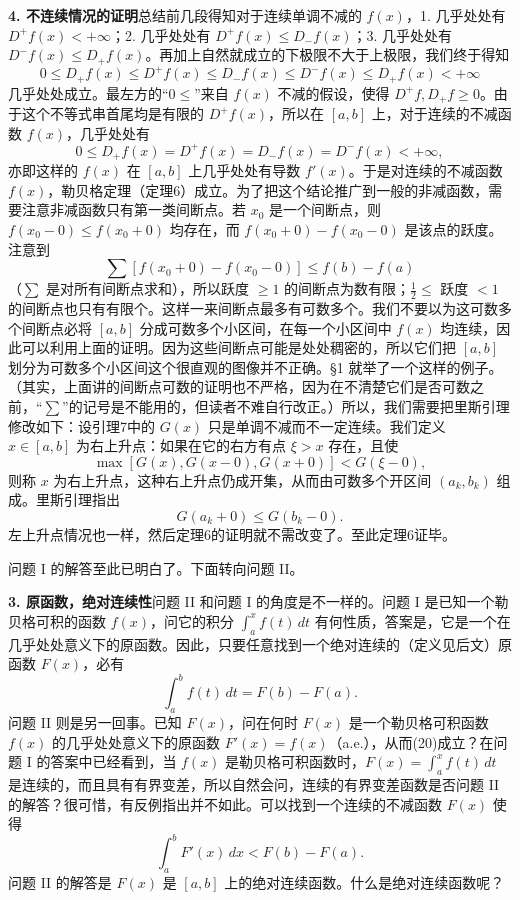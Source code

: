 \noindent\textbf{4. 不连续情况的证明}\quad 总结前几段得知对于连续单调不减的 $f(x)$，1. 几乎处处有 $D^+f(x)<+\infty$；2. 几乎处处有 $D^+f(x)\le D_-f(x)$；3. 几乎处处有 $D^-f(x)\le D_+f(x)$。再加上自然就成立的下极限不大于上极限，我们终于得知
\[
 0\le D_+f(x)\le D^+f(x)\le D_-f(x)\le D^-f(x)\le D_+f(x)<+\infty
\]
几乎处处成立。最左方的“$0\le$”来自 $f(x)$ 不减的假设，使得 $D^+f,D_+f\ge0$。由于这个不等式串首尾均是有限的 $D^+f(x)$，所以在 $[a,b]$ 上，对于连续的不减函数 $f(x)$，几乎处处有
\begin{equation}
 0\le D_+f(x)=D^+f(x)=D_-f(x)=D^-f(x)<+\infty,
 \tag{19}
\end{equation}
亦即这样的 $f(x)$ 在 $[a,b]$ 上几乎处处有导数 $f'(x)$。于是对连续的不减函数 $f(x)$，勒贝格定理（定理6）成立。为了把这个结论推广到一般的非减函数，需要注意非减函数只有第一类间断点。若 $x_0$ 是一个间断点，则 $f(x_0-0)\le f(x_0+0)$ 均存在，而 $f(x_0+0)-f(x_0-0)$ 是该点的跃度。注意到
\[
 \sum[f(x_0+0)-f(x_0-0)]\le f(b)-f(a)
\]
（$\sum$ 是对所有间断点求和），所以跃度 $\ge1$ 的间断点为数有限；$\tfrac12\le$ 跃度 $<1$ 的间断点也只有有限个。这样一来间断点最多有可数多个。我们不要以为这可数多个间断点必将 $[a,b]$ 分成可数多个小区间，在每一个小区间中 $f(x)$ 均连续，因此可以利用上面的证明。因为这些间断点可能是处处稠密的，所以它们把 $[a,b]$ 划分为可数多个小区间这个很直观的图像并不正确。§1 就举了一个这样的例子。（其实，上面讲的间断点可数的证明也不严格，因为在不清楚它们是否可数之前，“$\sum$”的记号是不能用的，但读者不难自行改正。）所以，我们需要把里斯引理修改如下：设引理7中的 $G(x)$ 只是单调不减而不一定连续。我们定义 $x\in[a,b]$ 为右上升点：如果在它的右方有点 $\xi>x$ 存在，且使
\[
 \max[G(x),G(x-0),G(x+0)]<G(\xi-0),
\]
则称 $x$ 为右上升点，这种右上升点仍成开集，从而由可数多个开区间 $(a_k,b_k)$ 组成。里斯引理指出
\[
 G(a_k+0)\le G(b_k-0).
\]
左上升点情况也一样，然后定理6的证明就不需改变了。至此定理6证毕。

问题 I 的解答至此已明白了。下面转向问题 II。

\medskip
\noindent\textbf{3. 原函数，绝对连续性}\quad 问题 II 和问题 I 的角度是不一样的。问题 I 是已知一个勒贝格可积的函数 $f(x)$，问它的积分 $\int_a^x f(t)\,dt$ 有何性质，答案是，它是一个在几乎处处意义下的原函数。因此，只要任意找到一个绝对连续的（定义见后文）原函数 $F(x)$，必有
\begin{equation}
 \int_a^b f(t)\,dt=F(b)-F(a).
 \tag{20}
\end{equation}
问题 II 则是另一回事。已知 $F(x)$，问在何时 $F(x)$ 是一个勒贝格可积函数 $f(x)$ 的几乎处处意义下的原函数 $F'(x)=f(x)$（a.e.），从而(20)成立？在问题 I 的答案中已经看到，当 $f(x)$ 是勒贝格可积函数时，$F(x)=\int_a^x f(t)\,dt$ 是连续的，而且具有有界变差，所以自然会问，连续的有界变差函数是否问题 II 的解答？很可惜，有反例指出并不如此。可以找到一个连续的不减函数 $F(x)$ 使得
\[
 \int_a^bF'(x)\,dx<F(b)-F(a).
\]
问题 II 的解答是 $F(x)$ 是 $[a,b]$ 上的绝对连续函数。什么是绝对连续函数呢？

